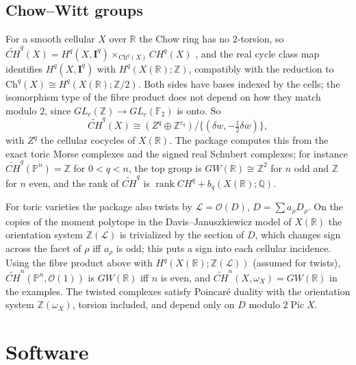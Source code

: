 \documentclass[11pt]{amsart}
\theoremstyle{definition}
\theoremstyle{remark}
\newcommand{\PP}{\mathbb{P}}
\newcommand{\QQ}{\mathbb{Q}}
\newcommand{\ZZ}{\mathbb{Z}}
\newcommand{\RR}{\mathbb{R}}
\begin{document}
\subsection{Chow--Witt groups}
For a smooth cellular $X$ over $\RR$ the Chow ring has no $2$-torsion, so
$\widetilde{CH}^q(X) = H^q(X,\mathbf I^q)\times_{\mathrm{Ch}^q(X)}CH^q(X)$
\cite[\S2]{HMW}, and the real cycle class map \cite{HWXZ} identifies
$H^q(X,\mathbf I^q)$ with $H^q(X(\RR);\ZZ)$, compatibly with the reduction to
$\mathrm{Ch}^q(X)\cong H^q(X(\RR);\ZZ/2)$. Both sides have bases indexed by the
cells; the isomorphism type of the fibre product does not depend on how they
match modulo $2$, since $GL_c(\ZZ)\to GL_c(\mathbb F_2)$ is onto. So
\[
\widetilde{CH}^q(X)\cong (Z^q\oplus\ZZ^{c_q})\big/\{(\delta w,-\tfrac12\delta w)\},
\]
with $Z^q$ the cellular cocycles of $X(\RR)$. The package computes this from
the exact toric Morse complexes and the signed real Schubert complexes; for
instance $\widetilde{CH}^q(\PP^n)=\ZZ$ for $0<q<n$, the top group is
$GW(\RR)\cong\ZZ^2$ for $n$ odd and $\ZZ$ for $n$ even, and the rank of
$\widetilde{CH}^q$ is $\operatorname{rank}CH^q+b_q(X(\RR);\QQ)$.

For toric varieties the package also twists by $\mathcal L=\mathcal O(D)$,
$D=\sum a_\rho D_\rho$. On the copies of the moment polytope in the
Davis--Januszkiewicz model of $X(\RR)$ the orientation system $\ZZ(\mathcal L)$ is
trivialized by the section of $D$, which changes sign across the facet of
$\rho$ iff $a_\rho$ is odd; this puts a sign into each cellular incidence.
Using the fibre product above with $H^q(X(\RR);\ZZ(\mathcal L))$ (assumed for
twists), $\widetilde{CH}^n(\PP^n,\mathcal O(1))$ is $GW(\RR)$ iff $n$ is even, and
$\widetilde{CH}^n(X,\omega_X)=GW(\RR)$ in the examples. The twisted complexes
satisfy Poincar\'e duality with the orientation system $\ZZ(\omega_X)$, torsion
included, and depend only on $D$ modulo $2\operatorname{Pic}X$.

\section{Software}\label{sec:software}
\end{document}
